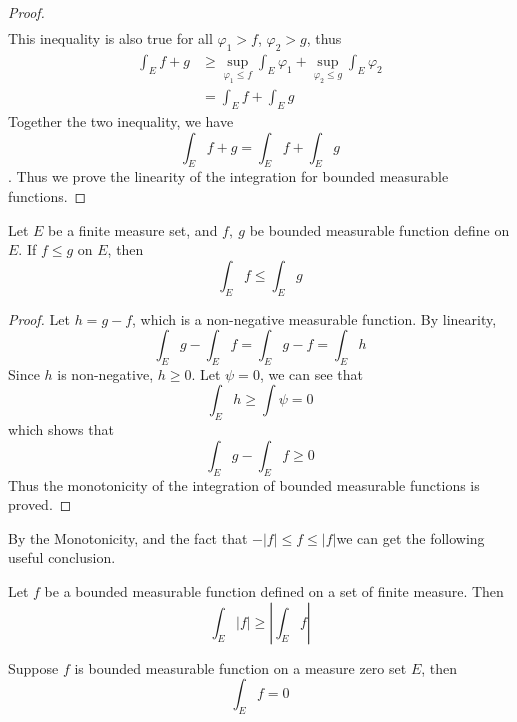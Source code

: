 \documentclass[lang=en, 12pt]{elegantbook}
\begin{document}
\begin{proof}
\begin{equation*}
\begin{aligned}
                \end{aligned}
            \end{equation*}
            This inequality is also true for all $\varphi_1 > f$, $\varphi_2 > g$, thus 
            \begin{equation*}
                \begin{aligned}
                    \int_E f+ g &\geq \sup_{\varphi_1 \leq f}\int_E \varphi_1 +  \sup_{\varphi_2 \leq g}\int_E \varphi_2\\
                    &= \int_E f +\int_E g 
                \end{aligned}
            \end{equation*}
            Together the two inequality, we have 
            $$\int_E f+ g = \int_E f +\int_E g $$.
            Thus we prove the linearity of the integration for bounded measurable functions.
            \end{proof}
            \begin{theorem}[Monotonicity]
                Let $E$ be a finite measure set, and $f, \ g$ be bounded measurable function define on $E$. If $f \leq g$ on $E$, then 
                \begin{equation}
                    \int_E f \leq \int_E g
                \end{equation}
            \end{theorem}
            \begin{proof}
                Let $h = g-f$, which is a non-negative measurable function. By linearity, 
                $$\int_E g - \int_E f  = \int_E g-f = \int_E h$$
                Since $h$ is non-negative, $h\geq 0$. Let $\psi = 0$, we can see that 
                $$\int_E h \geq \int \psi = 0 $$
            which shows that $$\int_E g - \int_E f  \geq 0$$
            Thus the monotonicity of the integration of bounded measurable functions is proved.
            \end{proof}
            By the Monotonicity, and the fact that $-|f|\leq f\leq |f|$we can get the following useful conclusion.
            \begin{corollary}
                Let $f$ be a bounded measurable function defined on a set of finite measure. Then
                $$\int_E |f| \geq | \int_E f |$$ 
            \end{corollary}
            \begin{proposition}\label{The integral over measure zero set is zero}
                Suppose $f$ is bounded measurable function on a measure zero set $ E$, then 
                $$\int_E f = 0$$
            \end{proposition}
\end{document}
